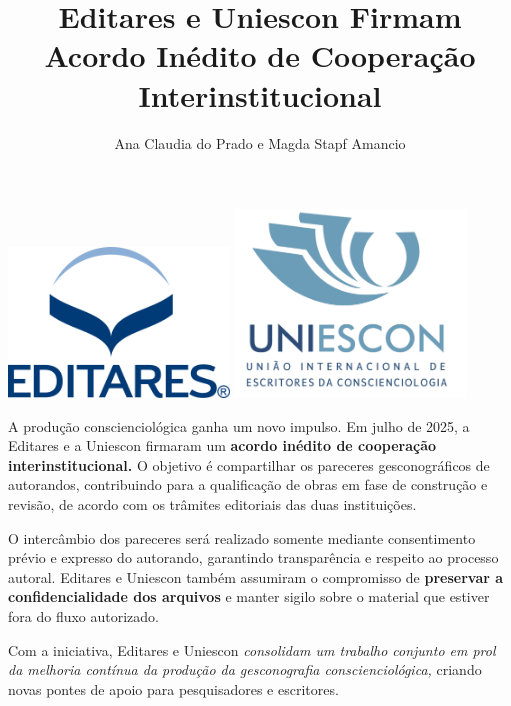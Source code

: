 \documentclass{gescons}
\author{Ana Claudia do Prado e Magda Stapf Amancio}
\title{Editares e Uniescon Firmam Acordo Inédito de Cooperação Interinstitucional}
\begin{document}
    \makeentrevistatitle


    
    
\begin{center}
    \includegraphics[height=4cm]{images/Logo-Editares-com-Marca-Registrada.png}
    \hspace{3cm}
    \includegraphics[height=5cm]{images/Logo-UNIESCON-2048x1741.png} 
    
\end{center}
    
    \begin{multicols}{2}

A produção conscienciológica ganha um novo impulso. Em julho de 2025, a Editares e a Uniescon firmaram um \textbf{acordo inédito de cooperação interinstitucional.} O objetivo é compartilhar os pareceres gesconográficos de autorandos, contribuindo para a qualificação de obras em fase de construção e revisão, de acordo com os trâmites editoriais das duas instituições.

O intercâmbio dos pareceres será realizado somente mediante consentimento prévio e expresso do autorando, garantindo transparência e respeito ao processo autoral. Editares e Uniescon também assumiram o compromisso de \textbf{preservar a confidencialidade dos arquivos} e manter sigilo sobre o material que estiver fora do fluxo autorizado.

Com a iniciativa, Editares e Uniescon \emph{consolidam um trabalho conjunto em prol da melhoria contínua da produção da gesconografia conscienciológica,} criando novas pontes de apoio para pesquisadores e escritores.



    \end{multicols}
\end{document}

